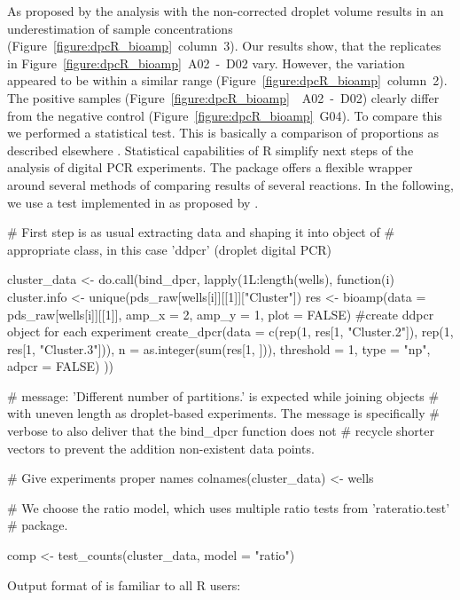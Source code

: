 As proposed by \citet{corbisier_2015} the analysis with the non-corrected 
droplet volume results in an underestimation of sample concentrations 
(Figure~\ref{figure:dpcR_bioamp}~column~3). Our results show, that the 
replicates in Figure~\ref{figure:dpcR_bioamp}~A02~-~D02 vary. However, the 
variation appeared to be within a similar range 
(Figure~\ref{figure:dpcR_bioamp}~column~2). The positive samples 
(Figure~\ref{figure:dpcR_bioamp}~~A02~-~D02) clearly differ from the negative 
control (Figure~\ref{figure:dpcR_bioamp}~G04). To compare this we performed a 
statistical test. This is basically a comparison of proportions as described 
elsewhere \citep{wang_2013}. Statistical capabilities of R simplify next steps 
of the analysis of digital PCR experiments. The  package offers a 
flexible wrapper  around several methods of comparing results 
of several reactions. In the following, we use a test implemented in 
 as proposed by \citet{Fay_2010}.

\begin{example}
# First step is as usual extracting data and shaping it into object of 
# appropriate class, in this case 'ddpcr' (droplet digital PCR)

cluster_data <- do.call(bind_dpcr, lapply(1L:length(wells), function(i) {
cluster.info <- unique(pds_raw[wells[i]][[1]]["Cluster"])
res <- bioamp(data = pds_raw[wells[i]][[1]], amp_x = 2, amp_y = 1, plot = FALSE)
#create ddpcr object for each experiment
create_dpcr(data = c(rep(1, res[1, "Cluster.2"]), rep(1, res[1, "Cluster.3"])), 
	    n = as.integer(sum(res[1, ])), threshold = 1, 
	    type = "np", adpcr = FALSE)
}))

# message: 'Different number of partitions.' is expected while joining objects
# with uneven length as droplet-based experiments. The message is specifically
# verbose to also deliver that the bind_dpcr function does not
# recycle shorter vectors to prevent the addition non-existent data points.

# Give experiments proper names
colnames(cluster_data) <- wells

# We choose the ratio model, which uses multiple ratio tests from 'rateratio.test'
# package.

comp <- test_counts(cluster_data, model = "ratio")
\end{example}

Output format of  is familiar to all R users:

